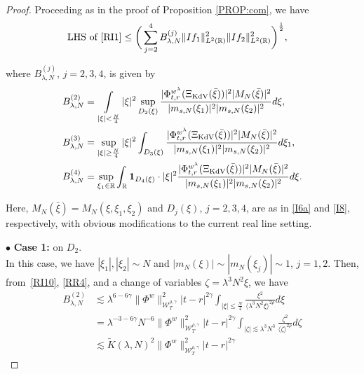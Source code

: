 \documentclass[letterpaper, 11pt,  reqno]{amsart}
\DeclareMathOperator*{\intt}{\int}
\newcommand{\1}{\hspace{0.5mm}\text{I}\hspace{0.5mm}}
\newcommand{\noi}{\noindent}
\newcommand{\R}{\mathbb{R}}
\newcommand{\g}{\gamma}
\newcommand{\ld}{\lambda}
\newcommand{\wt}{\widetilde}
\newcommand{\les}{\lesssim}
\newcommand{\jb}[1]
{\langle #1 \rangle}
\newcommand{\ind}{\mathbf 1}
\newcommand{\W}{\mathcal{W}}
\newcommand{\z}{\zeta}
\newcommand{\KDV}{\text{\rm KdV} }
\numberwithin{equation}{section}
\numberwithin{theorem}{section}
\begin{document}
\begin{proof}










Proceeding as in 
the proof of Proposition \ref{PROP:com}, 
we have 
\begin{align*}
\text{LHS of \eqref{RI1}}
&\leq \bigg(\sum_{j = 2}^4 
B_{\ld, N}^{(j)} \| I  f_1 \|_{L^2(\R)}^2 \| I  f_2 \|_{L^2(\R)}^2\bigg)^\frac 12 , 
\end{align*}

\noi
where $B_{\ld, N}^{(j)}$, $j = 2, 3, 4$, is given by 
\begin{align}
B_{\ld, N}^{(2)}
& =
 \intt_{|\xi|<  \frac N4 } |\xi|^2 \sup_{D_2(\xi)} 
\frac{ |\Phi^{w^\ld}_{t,r}(\Xi_\KDV(\bar \xi))|^2 |M_N(\bar \xi)|^2}{|m_{s, N}(\xi_1)|^2 |m_{s, N}(\xi_2)|^2}
d\xi,
\label{RI10}\\
B_{\ld, N}^{(3)}
& =
\sup_{|\xi|\geq \frac N4} |\xi|^2
\int_{D_3(\xi)}
 \frac{|\Phi^{w^\ld}_{t,r}(\Xi_\KDV(\bar \xi)) |^2  |M_N(\bar \xi)|^2 }{ |m_{s, N}(\xi_1)|^2|m_{s, N}(\xi_2)|^2}
 d\xi_1,
\label{RI11}\\
B_{\ld, N}^{(4)}
& =
\sup_{\xi_1 \in \R}
\int_\R
\ind_{D_4(\xi)}\cdot |\xi|^2 
\frac{ |\Phi^{w^\ld}_{t,r}(\Xi_\KDV(\bar \xi))|^2 |M_N(\bar \xi)|^2}{|m_{s, N}(\xi_1)|^2 |m_{s, N}(\xi_2)|^2}
d\xi.
\label{RI11a}
\end{align}

\noi
Here, 
$M_N(\bar \xi) = M_N(\xi, \xi_1, \xi_2)$
and $D_j(\xi)$, $j = 2, 3, 4$, 
are 
as in \eqref{I6a} and \eqref{I8}, respectively, 
with obvious modifications
to the current real line setting.







\medskip

\noi
$\bullet$ \textbf{Case 1:} on  $D_2$.\\
\indent
In this case, we have $|\xi_1|,   |\xi_2| \sim N$
and  $|m_N(\xi)| \sim |m_N(\xi_j)| \sim 1$, $j = 1, 2$.
Then, from~\eqref{RI10},  \eqref{RR4}, 
and
a change of variables $\z = \ld^3 N^2 \xi$, we have 
\begin{align*}
B_{\ld, N}^{(2)}
&\les 
\ld^{6-6\g}
 \| \Phi^{w} \|^2_{\W_{T}^{\rho, \g}}  
|t-r|^{2\g}
\intt_{ |\xi|\leq \frac N4} \frac{\xi^{2}}{\jb{\ld^3 N^2 \xi}^{2\rho}}d \xi 
 \\
&= 
\ld^{-3- 6\g}N^{ - 6}
 \| \Phi^{w} \|^2_{\W_{T}^{\rho, \g}}  
|t-r|^{2\g}
\intt_{ |\z|\les \ld^3 N^3 } \frac{\z^{2}}{\jb{\z}^{2\rho}}d \z\\
 &\les 
\wt K(\ld, N)^2
 \| \Phi^{w} \|^2_{\W_{T}^{\rho, \g}}  
|t-r|^{2\g}
\end{align*}


\end{proof}
\end{document}
